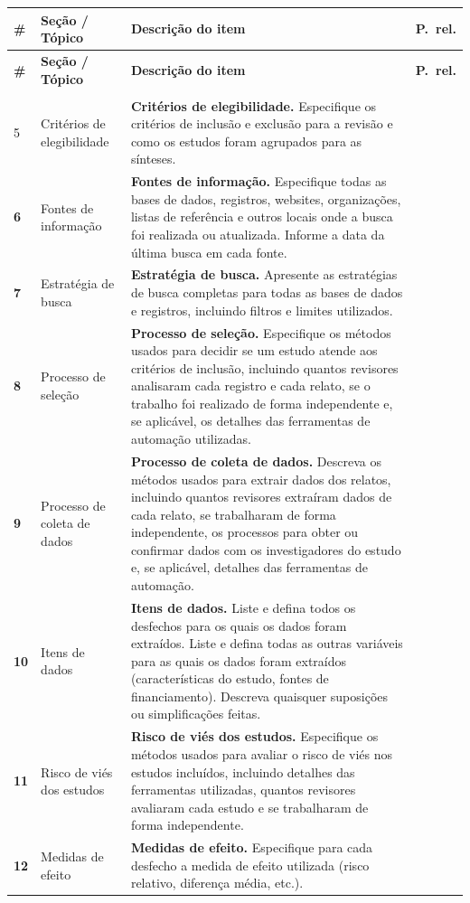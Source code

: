 \documentclass[11pt]{article}
\newenvironment{prismachecklist}{%
\begin{longtable}{
  >{\footnotesize\bfseries}C{1.2cm}
  >{\footnotesize}L{2.8cm}
  >{\footnotesize}L{9cm}
  >{\footnotesize\centering}C{2cm}
}
  \toprule
  \rowcolor{corSecao!20}
  \textbf{\#} &
  \textbf{Seção / Tópico} &
  \textbf{Descrição do item} &
  \textbf{P.\ rel.} \\
  \midrule
  \endfirsthead
  \toprule
  \rowcolor{corSecao!20}
  \textbf{\#} &
  \textbf{Seção / Tópico} &
  \textbf{Descrição do item} &
  \textbf{P.\ rel.} \\
  \midrule
  \endhead
  \midrule
  \multicolumn{4}{r}{\footnotesize\itshape Continua na próxima página...} \\
  \endfoot
  \bottomrule
  \endlastfoot
}{%
  \end{longtable}
}
\begin{document}
\begin{prismachecklist}
5 & Critérios de elegibilidade &
  \textbf{Critérios de elegibilidade.} Especifique os critérios de inclusão
  e exclusão para a revisão e como os estudos foram agrupados para as
  sínteses. &
  \\

6 & Fontes de informação &
  \textbf{Fontes de informação.} Especifique todas as bases de dados,
  registros, websites, organizações, listas de referência e outros locais
  onde a busca foi realizada ou atualizada. Informe a data da última busca
  em cada fonte. &
  \\

7 & Estratégia de busca &
  \textbf{Estratégia de busca.} Apresente as estratégias de busca completas
  para todas as bases de dados e registros, incluindo filtros e limites
  utilizados. &
  \\

8 & Processo de seleção &
  \textbf{Processo de seleção.} Especifique os métodos usados para decidir
  se um estudo atende aos critérios de inclusão, incluindo quantos
  revisores analisaram cada registro e cada relato, se o trabalho foi
  realizado de forma independente e, se aplicável, os detalhes das
  ferramentas de automação utilizadas. &
  \\

9 & Processo de coleta de dados &
  \textbf{Processo de coleta de dados.} Descreva os métodos usados para
  extrair dados dos relatos, incluindo quantos revisores extraíram dados
  de cada relato, se trabalharam de forma independente, os processos
  para obter ou confirmar dados com os investigadores do estudo e, se
  aplicável, detalhes das ferramentas de automação. &
  \\

10 & Itens de dados &
  \textbf{Itens de dados.} Liste e defina todos os desfechos para os quais
  os dados foram extraídos. Liste e defina todas as outras variáveis para
  as quais os dados foram extraídos (características do estudo, fontes de
  financiamento). Descreva quaisquer suposições ou simplificações feitas. &
  \\

11 & Risco de viés dos estudos &
  \textbf{Risco de viés dos estudos.} Especifique os métodos usados para
  avaliar o risco de viés nos estudos incluídos, incluindo detalhes das
  ferramentas utilizadas, quantos revisores avaliaram cada estudo e se
  trabalharam de forma independente. &
  \\

12 & Medidas de efeito &
  \textbf{Medidas de efeito.} Especifique para cada desfecho a medida de
  efeito utilizada (risco relativo, diferença média, etc.). &
  \\


\end{prismachecklist}
\end{document}
